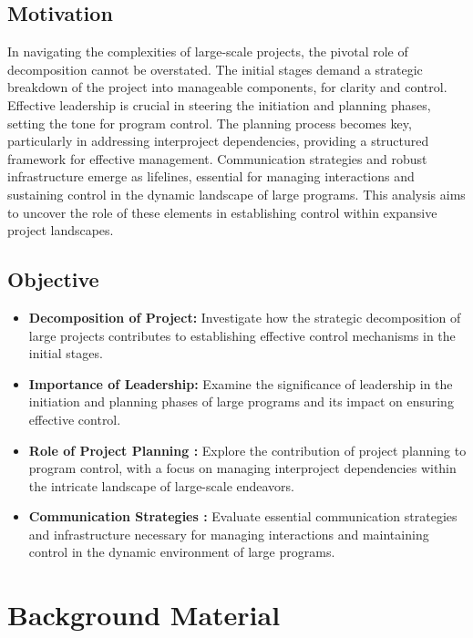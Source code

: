 \documentclass[runningheads]{llncs}
\begin{document}
\subsection{Motivation}

In navigating the complexities of large-scale projects, the pivotal role of decomposition cannot be overstated. The initial stages demand a strategic breakdown of the project into manageable components, for clarity and control. Effective leadership is crucial in steering the initiation and planning phases, setting the tone for program control. The planning process becomes key, particularly in addressing interproject dependencies, providing a structured framework for effective management. Communication strategies and robust infrastructure emerge as lifelines, essential for managing interactions and sustaining control in the dynamic landscape of large programs. This analysis aims to uncover the role of these elements in establishing control within expansive project landscapes.


\subsection{Objective}

\begin{itemize}
    \item \textbf{Decomposition of Project:}
    Investigate how the strategic decomposition of large projects contributes to establishing effective control mechanisms in the initial stages.

    
    \item \textbf{Importance of Leadership:}
    Examine the significance of leadership in the initiation and planning phases of large programs and its impact on ensuring effective control.

    
    \item \textbf{Role of Project Planning :}
    Explore the contribution of project planning to program control, with a focus on managing interproject dependencies within the intricate landscape of large-scale endeavors.

    
    \item \textbf{Communication Strategies :}
    Evaluate essential communication strategies and infrastructure necessary for managing interactions and maintaining control in the dynamic environment of large programs.
\end{itemize}


\section{Background Material}
\end{document}
